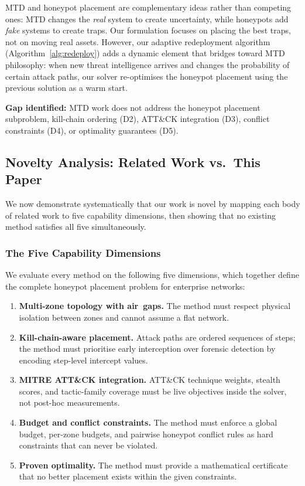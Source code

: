 \documentclass[journal]{IEEEtran}
\begin{document}
MTD and honeypot placement are complementary ideas rather
than competing ones: MTD changes the \emph{real} system to
create uncertainty, while honeypots add \emph{fake} systems
to create traps.
Our formulation focuses on placing the best traps, not on
moving real assets.
However, our adaptive redeployment algorithm
(Algorithm~\ref{alg:redeploy}) adds a dynamic element that
bridges toward MTD philosophy: when new threat intelligence
arrives and changes the probability of certain attack paths,
our solver re-optimises the honeypot placement using the
previous solution as a warm start.

\textbf{Gap identified:} MTD work does not address the
honeypot placement subproblem, kill-chain ordering (D2),
ATT\&CK integration (D3), conflict constraints (D4), or
optimality guarantees (D5).

\subsection{Novelty Analysis: Related Work vs.\ This Paper}
\label{subsec:novelty}

We now demonstrate systematically that our work is novel by
mapping each body of related work to five capability
dimensions, then showing that no existing method satisfies
all five simultaneously.

\subsubsection{The Five Capability Dimensions}

We evaluate every method on the following five dimensions,
which together define the complete honeypot placement problem
for enterprise networks:

\begin{enumerate}
  \item[\textbf{D1}] \textbf{Multi-zone topology with
  air~gaps.}  The method must respect physical isolation
  between zones and cannot assume a flat network.

  \item[\textbf{D2}] \textbf{Kill-chain-aware placement.}
  Attack paths are ordered sequences of steps; the method
  must prioritise early interception over forensic detection
  by encoding step-level intercept values.

  \item[\textbf{D3}] \textbf{MITRE ATT\&CK integration.}
  ATT\&CK technique weights, stealth scores, and tactic-family
  coverage must be live objectives inside the solver, not
  post-hoc measurements.

  \item[\textbf{D4}] \textbf{Budget and conflict
  constraints.}  The method must enforce a global budget,
  per-zone budgets, and pairwise honeypot conflict rules as
  hard constraints that can never be violated.

  \item[\textbf{D5}] \textbf{Proven optimality.}  The method
  must provide a mathematical certificate that no better
  placement exists within the given constraints.
\end{enumerate}
\end{document}
